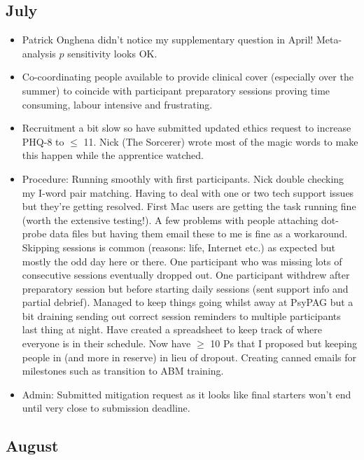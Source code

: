 \documentclass[british]{article}
\begin{document}
\subsection{July}

\begin{itemize}
  \item Patrick Onghena didn't notice my supplementary question in April!
    Meta-analysis ${p}$ sensitivity looks OK.

  \item Co-coordinating people available to provide clinical cover
  (especially over the summer) to coincide with participant preparatory
  sessions proving time consuming, labour intensive and frustrating.

  \item Recruitment a bit slow so have submitted updated ethics request
    to increase PHQ-8 to ${\leq}$ 11. Nick (The Sorcerer) wrote most of the
  magic words to make this happen while the apprentice watched.

  \item Procedure: Running smoothly with first participants. Nick
  double checking my I-word pair matching. Having to deal with one or
  two tech support issues but they're getting resolved. First Mac users
  are getting the task running fine (worth the extensive testing!). A
  few problems with people attaching dot-probe data files but having them
  email these to me is fine as a workaround. Skipping sessions is common
  (reasons: life, Internet etc.) as expected but mostly the odd day here
  or there. One participant who was missing lots of consecutive sessions
  eventually dropped out. One participant withdrew after preparatory
  session but before starting daily sessions (sent support info and
  partial debrief). Managed to keep things going whilst away at PsyPAG
  but a bit draining sending out correct session reminders to multiple
  participants last thing at night. Have created a spreadsheet to keep
  track of where everyone is in their schedule. Now have ${\geq}$ 10 Ps
  that I proposed but keeping people in (and more in reserve) in lieu
  of dropout.  Creating canned emails for milestones such as transition
  to ABM training.

  \item Admin: Submitted mitigation request as it looks like final
  starters won't end until very close to submission deadline.

\end{itemize}

\subsection{August}
\end{document}
